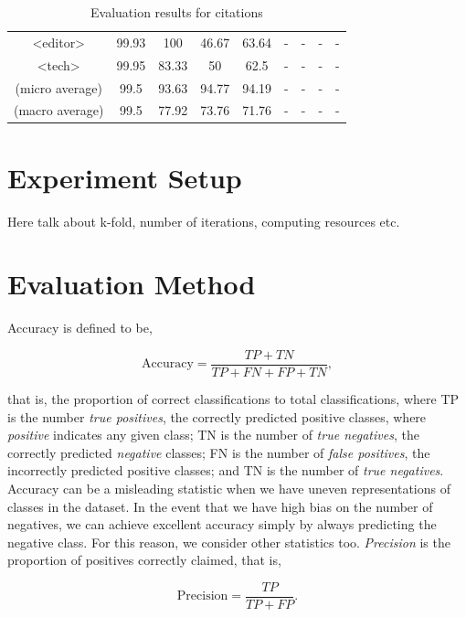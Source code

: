 \begin{table}[h]
\begin{center}
\begin{tabular}{|c|cccc|cccc|}
<editor>    &  99.93&   100     &46.67      &   63.64   & -     &   -   &   -       &   -   \\
<tech>  &   99.95   &   83.33   &   50      &   62.5    & -     &   -   &   -       &   -   \\
\hline
(micro average) & 99.5  &   93.63   &   94.77   &   94.19 & -    &   - &   -   &   -   \\
(macro average) & 99.5  &   77.92   &   73.76   &   71.76 & -    &   -  &   -   &   -   \\
\hline
\end{tabular}
\caption[Evaluation results for citations]{Evaluation results for citations}
\label{table:citationcomparison}
\end{center}
\end{table}

\section{Experiment Setup}
\label{sec:experimentsetup}
Here talk about k-fold, number of iterations, computing resources etc.

\section{Evaluation Method}

Accuracy is defined to be,

\begin{equation}
\text{Accuracy} = \frac{TP + TN}{TP + FN + FP + TN},
\label{eq:accuracy}
\end{equation}

that is, the proportion of correct classifications to total classifications, where TP is the number \emph{true positives}, the correctly predicted positive classes, where \emph{positive} indicates any given class; TN is the number of \emph{true negatives}, the correctly predicted \emph{negative} classes; FN is the number of \emph{false positives}, the incorrectly predicted positive classes; and TN is the number of \emph{true negatives}. Accuracy can be a misleading statistic when we have uneven representations of classes in the dataset. In the event that we have high bias on the number of negatives, we can achieve excellent accuracy simply by always predicting the negative class. For this reason, we consider other statistics too. \emph{Precision} is the proportion of positives correctly claimed, that is,

\begin{equation}
\text{Precision} = \frac{TP}{TP + FP}.
\label{eq:precision}
\end{equation}


